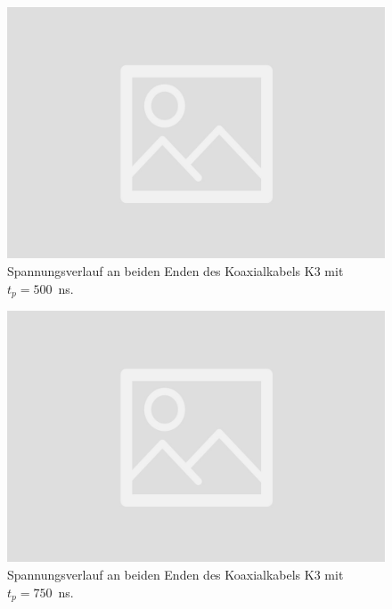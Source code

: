 \documentclass{article}
\begin{document}
\begin{figure}[H]
\centering
\caption{Spannungsverlauf an beiden Enden des Koaxialkabels K3 mit $t_p=500$~ns.}
\label{fig:task1a_500ns}
\includegraphics[scale=0.1]{bilder/task1a/leer.jpg}
\end{figure}


\begin{figure}[H]
\centering
\caption{Spannungsverlauf an beiden Enden des Koaxialkabels K3 mit $t_p=750$~ns.}
\label{fig:task1a_750ns}
\includegraphics[scale=0.1]{bilder/task1a/leer.jpg}
\end{figure}
\end{document}
